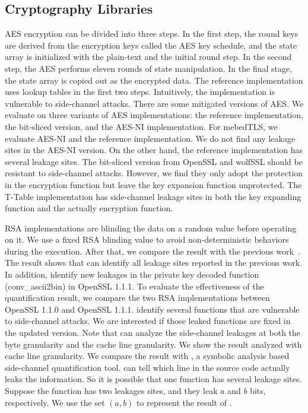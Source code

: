 \subsection{Cryptography Libraries}
AES encryption can be divided into three steps. In the first step, the round keys are derived from the encryption keys called the AES key schedule, and the state array is initialized with the plain-text and the initial round step. In the second step, the AES performs eleven rounds of state manipulation. In the final stage, the state array is copied out as the encrypted data.
The reference implementation uses lookup tables in the first two steps. Intuitively, the implementation is vulnerable to side-channel attacks. There are some mitigated versions of AES. We evaluate \ctool{} on three variants of AES implementations: the reference implementation, the bit-sliced version, and the AES-NI implementation.
For mebedTLS, we evaluate AES-NI and the reference implementation. We do not find any leakage sites in the AES-NI version. On the other hand, the reference implementation has several leakage sites. The bit-sliced version from OpenSSL and wolfSSL should be resistant to side-channel attacks. However, we find they only adopt the protection in the encryption function but leave the key expansion function unprotected. The T-Table implementation has side-channel leakage sites in both the key expanding function and the actually encryption function. 

RSA implementations are blinding the data on a random value before operating on it. We use a fixed RSA blinding value to avoid non-deterministic behaviors during the execution. After that, we compare the result with the previous work~\cite{bao2021abacus,203878}. The result shows that \ctool{} can identify all leakage sites reported in the previous work. In addition, \ctool{} identify new leakages in the private key decoded function (\textsf{conv\_ascii2bin}) in OpenSSL 1.1.1.  To evaluate the effectiveness of the quantification result, we compare the two RSA implementations between OpenSSL 1.1.0 and OpenSSL 1.1.1.  \ctool{} identify several functions that are vulnerable to side-channel attacks. We are interested if those leaked functions are fixed in the updated version.
Note that \ctool{} can analyze the side-channel leakages at both the byte granularity and the cache line granularity. We show the result analyzed with cache line granularity. We compare the result with \tool{}, a symbolic analysis based side-channel quantification tool. \tool{} can tell which line in the source code actually leaks the information. So it is possible that one function has several leakage sites. Suppose the function has two leakages sites, and they leak $a$ and $b$ bits, respectively. We use the set $(a, b)$ to represent the result of \tool{}.

